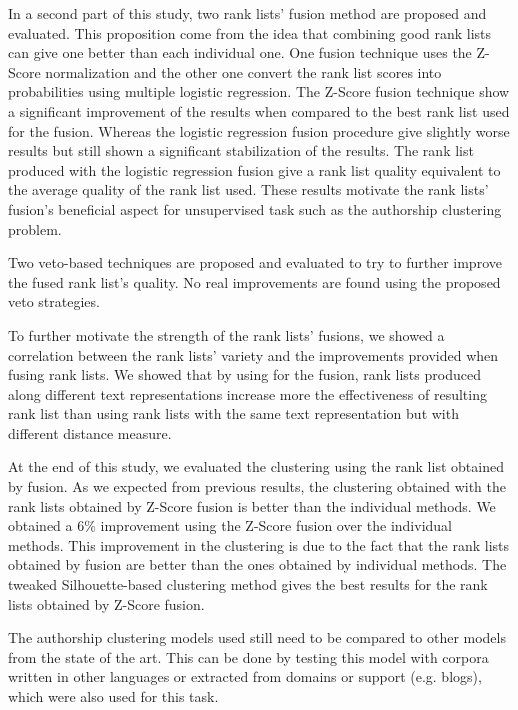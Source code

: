 In a second part of this study, two rank lists' fusion method are proposed and evaluated.
This proposition come from the idea that combining good rank lists can give one better than each individual one.
One fusion technique uses the Z-Score normalization and the other one convert the rank list scores into probabilities using multiple logistic regression.
The Z-Score fusion technique show a significant improvement of the results when compared to the best rank list used for the fusion.
Whereas the logistic regression fusion procedure give slightly worse results but still shown a significant stabilization of the results.
The rank list produced with the logistic regression fusion give a rank list quality equivalent to the average quality of the rank list used.
These results motivate the rank lists' fusion's beneficial aspect for unsupervised task such as the authorship clustering problem.

Two veto-based techniques are proposed and evaluated to try to further improve the fused rank list's quality.
No real improvements are found using the proposed veto strategies.

To further motivate the strength of the rank lists' fusions, we showed a correlation between the rank lists' variety and the improvements provided when fusing rank lists.
We showed that by using for the fusion, rank lists produced along different text representations increase more the effectiveness of resulting rank list than using rank lists with the same text representation but with different distance measure.

At the end of this study, we evaluated the clustering using the rank list obtained by fusion.
As we expected from previous results, the clustering obtained with the rank lists obtained by Z-Score fusion is better than the individual methods.
We obtained a 6\% improvement using the Z-Score fusion over the individual methods.
This improvement in the clustering is due to the fact that the rank lists obtained by fusion are better than the ones obtained by individual methods.
The tweaked Silhouette-based clustering method gives the best results for the rank lists obtained by Z-Score fusion.


The authorship clustering models used still need to be compared to other models from the state of the art.
This can be done by testing this model with corpora written in other languages or extracted from domains or support (e.g. blogs), which were also used for this task.

